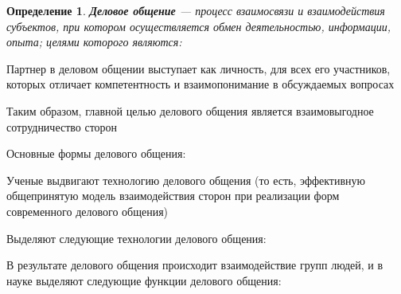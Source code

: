 \documentclass[a4paper,14pt]{extarticle}
\newtheorem{definition}{Определение}
\begin{document}
\begin{definition}
    \textbf{Деловое общение} — процесс взаимосвязи и взаимодействия субъектов, при котором осуществляется обмен деятельностью, информации, опыта; целями которого являются:
    \begin{multienumerate}
    \end{multienumerate}
\end{definition}

Партнер в деловом общении выступает как личность, для всех его участников, которых отличает компетентность и взаимопонимание в обсуждаемых вопросах

Таким образом, главной целью делового общения является взаимовыгодное сотрудничество сторон

Основные формы делового общения:
\begin{multienumerate}
\end{multienumerate}

Ученые выдвигают технологию делового общения (то есть, эффективную общепринятую модель взаимодействия сторон при реализации форм современного делового общения)

Выделяют следующие технологии делового общения:
\begin{multienumerate}
\end{multienumerate}

В результате делового общения происходит взаимодействие групп людей, и в науке выделяют следующие функции делового общения:

\begin{multienumerate}
\end{multienumerate}
\end{document}
